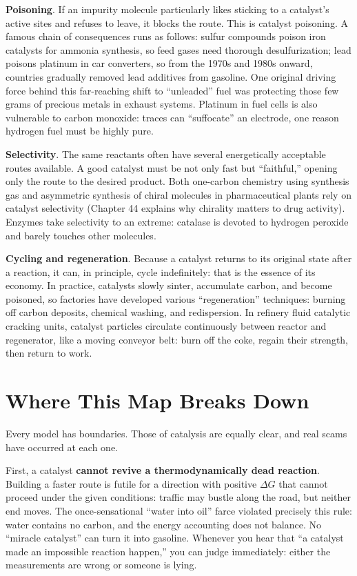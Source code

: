 \textbf{Poisoning}. If an impurity molecule particularly likes sticking to a catalyst's active sites and refuses to leave, it blocks the route. This is catalyst poisoning. A famous chain of consequences runs as follows: sulfur compounds poison iron catalysts for ammonia synthesis, so feed gases need thorough desulfurization; lead poisons platinum in car converters, so from the 1970s and 1980s onward, countries gradually removed lead additives from gasoline. One original driving force behind this far-reaching shift to ``unleaded'' fuel was protecting those few grams of precious metals in exhaust systems. Platinum in fuel cells is also vulnerable to carbon monoxide: traces can ``suffocate'' an electrode, one reason hydrogen fuel must be highly pure.

\textbf{Selectivity}. The same reactants often have several energetically acceptable routes available. A good catalyst must be not only fast but ``faithful,'' opening only the route to the desired product. Both one-carbon chemistry using synthesis gas and asymmetric synthesis of chiral molecules in pharmaceutical plants rely on catalyst selectivity (Chapter 44 explains why chirality matters to drug activity). Enzymes take selectivity to an extreme: catalase is devoted to hydrogen peroxide and barely touches other molecules.

\textbf{Cycling and regeneration}. Because a catalyst returns to its original state after a reaction, it can, in principle, cycle indefinitely: that is the essence of its economy. In practice, catalysts slowly sinter, accumulate carbon, and become poisoned, so factories have developed various ``regeneration'' techniques: burning off carbon deposits, chemical washing, and redispersion. In refinery fluid catalytic cracking units, catalyst particles circulate continuously between reactor and regenerator, like a moving conveyor belt: burn off the coke, regain their strength, then return to work.

\section{Where This Map Breaks Down}

Every model has boundaries. Those of catalysis are equally clear, and real scams have occurred at each one.

First, a catalyst \textbf{cannot revive a thermodynamically dead reaction}. Building a faster route is futile for a direction with positive $\Delta G$ that cannot proceed under the given conditions: traffic may bustle along the road, but neither end moves. The once-sensational ``water into oil'' farce violated precisely this rule: water contains no carbon, and the energy accounting does not balance. No ``miracle catalyst'' can turn it into gasoline. Whenever you hear that ``a catalyst made an impossible reaction happen,'' you can judge immediately: either the measurements are wrong or someone is lying.

